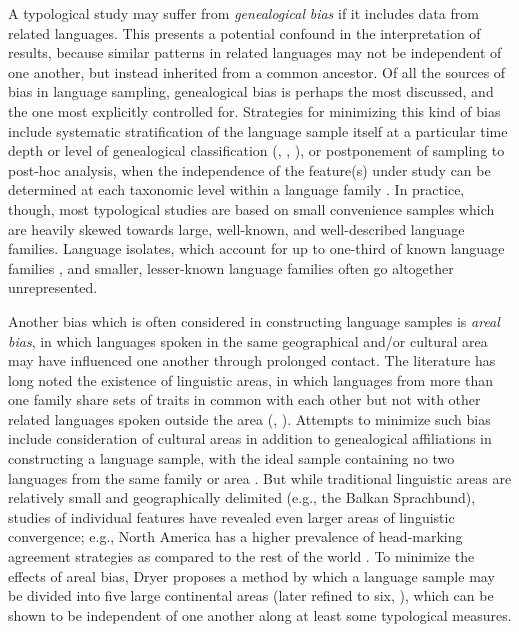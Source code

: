   A typological study may suffer from \textit{genealogical} \textit{bias} if it includes data from related languages. This presents a potential confound in the interpretation of results, because similar patterns in related languages may not be independent of one another, but instead inherited from a common ancestor. Of all the sources of bias in language sampling, genealogical bias is perhaps the most discussed, and the one most explicitly controlled for. Strategies for minimizing this kind of bias include systematic stratification of the language sample itself at a particular time depth or level of genealogical classification (\citealt{Bell1978b}, \citealt{Maddieson1984}, \citealt{Dryer1989}), or postponement of sampling to post-hoc analysis, when the independence of the feature(s) under study can be determined at each taxonomic level within a language family \citep{Bickel2008}. In practice, though, most typological studies are based on small convenience samples which are heavily skewed towards large, well-known, and well-described language families. Language isolates, which account for up to one-third of known language families \citep{Campbell2016}, and smaller, lesser-known language families often go altogether unrepresented.

  Another bias which is often considered in constructing language samples is \textit{areal} \textit{bias}, in which languages spoken in the same geographical and/or cultural area may have influenced one another through prolonged contact. The literature has long noted the existence of linguistic areas, in which languages from more than one family share sets of traits in common with each other but not with other related languages spoken outside the area (\citealt{AikhenvaldDixon2001a}, \citealt{Chirikba2008}). Attempts to minimize such bias include consideration of cultural areas in addition to genealogical affiliations in constructing a language sample, with the ideal sample containing no two languages from the same family or area \citep{Perkins1985}. But while traditional linguistic areas are relatively small and geographically delimited (e.g., the Balkan Sprachbund), studies of individual features have revealed even larger areas of linguistic convergence; e.g., North America has a higher prevalence of head-marking agreement strategies as compared to the rest of the world \citep{Dryer1989}. To minimize the effects of areal bias, Dryer proposes a method by which a language sample may be divided into five large continental areas (later refined to six, \citealt{Dryer1992}), which can be shown to be independent of one another along at least some typological measures.

